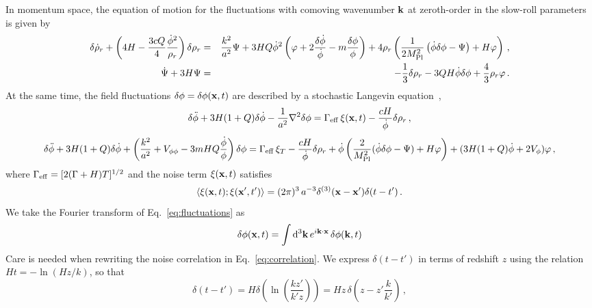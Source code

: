 In momentum space, the equation of motion for the fluctuations with comoving wavenumber ${\bf k}$ at zeroth-order in the slow-roll parameters is given by~\cite{Kodama:1984ziu, Hwang:1991aj, Hwang:2001fb, Malik:2002jb}
\begin{eqnarray}
    \delta\dot \rho_r + \left(4 H - \frac{3 c Q}{4}\frac{\dot\phi^2}{\rho_r}\right) \delta\rho_r &=& \frac{k^2}{a^2} \Psi + 3H Q \dot\phi^2\left(\varphi + 2 \frac{\delta\dot\phi}{\dot\phi} - m \frac{\delta\phi}{\phi}\right) + 4 \rho_r \left(\frac{1}{2 M_{\rm Pl}^2}\left(\dot\phi\delta\phi - \Psi\right) + H \varphi\right)\,,\label{eq:fluctuationsR}\\
	\dot\Psi + 3H\Psi &=& - \frac{1}{3}\delta\rho_r - 3QH\dot\phi\delta\phi + \frac{4}{3}\rho_r\varphi\,.\label{eq:fluctuationsPsi}
\end{eqnarray}
At the same time, the field fluctuations $\delta \phi = \delta \phi({\bf x}, t)$ are described by a stochastic Langevin equation~\cite{Moss:2007cv, Graham:2009bf},
\begin{equation}
	\label{eq:fluctuations}
	\delta\ddot\phi + 3H(1+Q) \delta\dot\phi - \frac{1}{a^2}\nabla^2\delta\phi = \Gamma_{\rm eff}\,\xi({\bf x}, t) - \frac{cH}{\dot\phi}\delta\rho_r\,,
\end{equation}
$$\delta\ddot\phi + 3 H (1 + Q) \delta\dot\phi + \left(\frac{k^2}{a^2} + V_{\phi\phi} - 3 m H Q \frac{\dot\phi}{\phi}\right) \delta\phi = \Gamma_{\rm eff}\,\xi_T - \frac{cH}{\dot\phi} \delta\rho_r + \dot\phi\left(\frac{2}{M_{\rm Pl}^2}(\dot\phi \delta\phi - \Psi) + H \varphi\right) + (3 H (1 + Q) \dot\phi + 2 V_\phi) \varphi\,,$$
where $\Gamma_{\rm eff} = [2(\Gamma+H)T]^{1/2}$ and the noise term $\xi({\bf x}, t)$ satisfies~\cite{Berera:2007qm}
\begin{equation}
	\label{eq:correlation}
	\langle\xi({\bf x}, t); \xi({\bf x'}, t') \rangle = (2\pi)^3\,a^{-3}\delta^{(3)}({\bf x}-{\bf x'})\delta(t-t')\,.
\end{equation}
We take the Fourier transform of Eq.~\eqref{eq:fluctuations} as
\begin{equation}
	\delta\phi({\bf x}, t) = \int {\rm d}^3{\bf k}\,e^{i {\bf k}\cdot{\bf x}} \,\delta\phi({\bf k}, t)
\end{equation}
Care is needed when rewriting the noise correlation in Eq.~\eqref{eq:correlation}. We express $\delta(t-t')$ in terms of redshift $z$ using the relation $Ht =-\ln(Hz/k)$, so that
\begin{equation}
	\delta(t-t') = H\delta\left(\ln\left(\frac{k z'}{k' z}\right)\right) = Hz \,\delta\left(z - z'\frac{k}{k'}\right)\,,
\end{equation}
